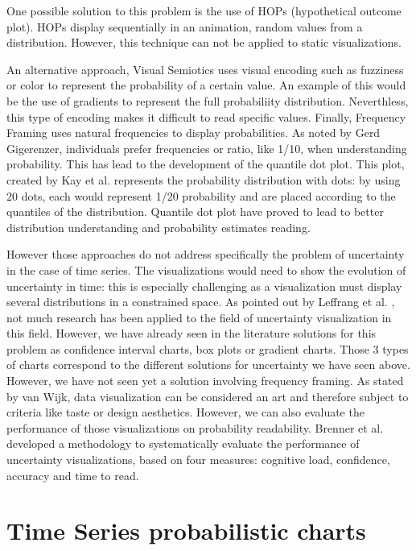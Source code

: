 \documentclass[a4paper,3p,sort&compress]{elsarticle}
\begin{document}
One possible solution to this problem is the use of HOPs (hypothetical outcome plot). HOPs display 
sequentially in an animation, random values from a distribution. However, this technique can not be 
applied to static visualizations. 

An alternative approach, Visual Semiotics uses visual encoding such as fuzziness or color to represent 
the probability of a certain value. An example of this would be the use of gradients to represent the 
full probabiliity distribution. Neverthless, this type of encoding makes it difficult to read specific 
values. Finally, Frequency Framing uses natural frequencies to display probabilities. As noted by Gerd 
Gigerenzer, individuals prefer frequencies or ratio, like 1/10, when understanding probability. This has 
lead to the development of the quantile dot plot. This plot, created by Kay et al. 
\cite{2016-when-ish-is-my-bus} 
represents 
the probability distribution with dots: by using 20 dots, each would represent 1/20 probability 
and are placed according 
to the quantiles of the distribution. Quantile dot plot have proved to lead to better distribution 
understanding and probability estimates reading. 

However those approaches do not address specifically the problem of uncertainty in the case of time series.
The visualizations would need to show the evolution of uncertainty in time: this 
is especially challenging as a visualization must display several distributions in a constrained space.  
As pointed out by Leffrang et al. \cite{leffrang_should_2021}, not much research has been applied to the 
field of uncertainty visualization in this field. 
However, we have already seen in the literature solutions for this problem as confidence interval charts,
 box plots or gradient charts. Those 3 types of charts correspond to the different solutions for uncertainty 
 we have seen above. However, we have not seen yet a solution involving frequency framing. As stated by van Wijk,
 data visualization can be considered an art and therefore subject to criteria like taste or design aesthetics. 
However, we can also evaluate the performance of those visualizations on probability readability.
Brenner et al. \cite{brennen_instrument_2018} developed a methodology to systematically evaluate the performance
of uncertainty visualizations, based on four measures: cognitive load, confidence, accuracy and time to read. 



\section{Time Series probabilistic charts}  
\label{sec:time_series}
\end{document}
